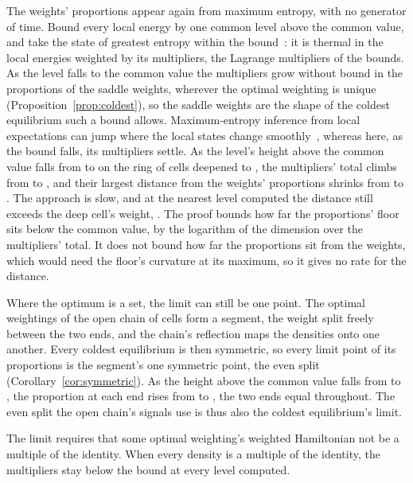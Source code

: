 \documentclass[aps,prd,reprint,superscriptaddress]{revtex4-2}
\begin{document}
The weights' proportions appear again from maximum entropy, with no generator of time. Bound every local energy by one common level above the common value, and take the state of greatest entropy within the bound~\cite{Jaynes1957,Jaynes1957b}: it is thermal in the local energies weighted by its multipliers, the Lagrange multipliers of the bounds. As the level falls to the common value the multipliers grow without bound in the proportions of the saddle weights, wherever the optimal weighting is unique (Proposition~\ref{prop:coldest}), so the saddle weights are the shape of the coldest equilibrium such a bound allows. Maximum-entropy inference from local expectations can jump where the local states change smoothly~\cite{ChenEtAl2015}, whereas here, as the bound falls, its multipliers settle. As the level's height above the common value falls from  to  on the ring of  cells deepened to , the multipliers' total climbs from  to , and their largest distance from the weights' proportions shrinks from  to . The approach is slow, and at the nearest level computed the distance still exceeds the deep cell's weight, . The proof bounds how far the proportions' floor sits below the common value, by the logarithm of the dimension over the multipliers' total. It does not bound how far the proportions sit from the weights, which would need the floor's curvature at its maximum, so it gives no rate for the distance.

Where the optimum is a set, the limit can still be one point. The optimal weightings of the open chain of  cells form a segment, the weight split freely between the two ends, and the chain's reflection maps the densities onto one another. Every coldest equilibrium is then symmetric, so every limit point of its proportions is the segment's one symmetric point, the even split (Corollary~\ref{cor:symmetric}). As the height above the common value falls from  to , the proportion at each end rises from  to , the two ends equal throughout. The even split the open chain's signals use is thus also the coldest equilibrium's limit.

The limit requires that some optimal weighting's weighted Hamiltonian not be a multiple of the identity. When every density is a multiple of the identity, the multipliers stay below the bound  at every level computed.
\end{document}
